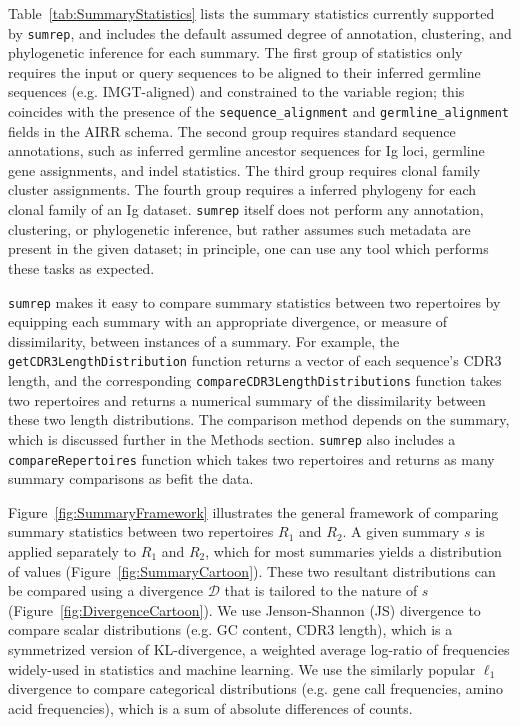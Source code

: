 \documentclass{article}
\begin{document}
Table~\ref{tab:SummaryStatistics} lists the summary statistics currently supported by \texttt{sumrep}, and includes the default assumed degree of annotation, clustering, and phylogenetic inference for each summary.
The first group of statistics only requires the input or query sequences to be  aligned to their inferred germline sequences (e.g. IMGT-aligned) and constrained to the variable region; this coincides with the presence of the \texttt{sequence\_alignment} and \texttt{germline\_alignment} fields in the AIRR schema.
The second group requires standard sequence annotations, such as inferred germline ancestor sequences for Ig loci, germline gene assignments, and indel statistics.
The third group requires clonal family cluster assignments.
The fourth group requires a inferred phylogeny for each clonal family of an Ig dataset.
\texttt{sumrep} itself does not perform any annotation, clustering, or phylogenetic inference, but rather assumes such metadata are present in the given dataset; in principle, one can use any tool which performs these tasks as expected.

\texttt{sumrep} makes it easy to compare summary statistics between two repertoires by equipping each summary with an appropriate divergence, or measure of dissimilarity, between instances of a summary.
For example, the \texttt{getCDR3LengthDistribution} function returns a vector of each sequence's CDR3 length, and the corresponding \texttt{compareCDR3LengthDistributions} function takes two repertoires and returns a numerical summary of the dissimilarity between these two length distributions.
The comparison method depends on the summary, which is discussed further in the Methods section.
\texttt{sumrep} also includes a \texttt{compareRepertoires} function which takes two repertoires and returns as many summary comparisons as befit the data.

Figure~\ref{fig:SummaryFramework} illustrates the general framework of comparing summary statistics between two repertoires $R_1$ and $R_2$.
A given summary $s$ is applied separately to $R_1$ and $R_2$, which for most summaries yields a distribution of values (Figure~\ref{fig:SummaryCartoon}).
These two resultant distributions can be compared using a divergence $\mathcal D$ that is tailored to the nature of $s$ (Figure~\ref{fig:DivergenceCartoon}).
We use Jenson-Shannon (JS) divergence to compare scalar distributions (e.g. GC content, CDR3 length), which is a symmetrized version of KL-divergence, a weighted average log-ratio of frequencies widely-used in statistics and machine learning.
We use the similarly popular $\ell_1$ divergence to compare categorical distributions (e.g. gene call frequencies, amino acid frequencies), which is a sum of absolute differences of counts.
\end{document}
